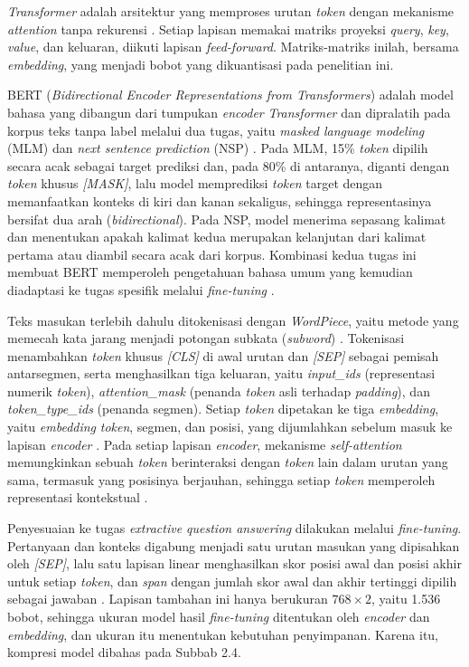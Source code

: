 \textit{Transformer} adalah arsitektur yang memproses urutan \textit{token} dengan mekanisme \textit{attention} tanpa rekurensi \parencite{vaswani2017attention}. Setiap lapisan memakai matriks proyeksi \textit{query}, \textit{key}, \textit{value}, dan keluaran, diikuti lapisan \textit{feed-forward}. Matriks-matriks inilah, bersama \textit{embedding}, yang menjadi bobot yang dikuantisasi pada penelitian ini.

BERT (\textit{Bidirectional Encoder Representations from Transformers}) adalah model bahasa yang dibangun dari tumpukan \textit{encoder} \textit{Transformer} dan dipralatih pada korpus teks tanpa label melalui dua tugas, yaitu \textit{masked language modeling} (MLM) dan \textit{next sentence prediction} (NSP) \parencite{devlin2019bert}. Pada MLM, 15\% \textit{token} dipilih secara acak sebagai target prediksi dan, pada 80\% di antaranya, diganti dengan \textit{token} khusus \textit{[MASK]}, lalu model memprediksi \textit{token} target dengan memanfaatkan konteks di kiri dan kanan sekaligus, sehingga representasinya bersifat dua arah (\textit{bidirectional}). Pada NSP, model menerima sepasang kalimat dan menentukan apakah kalimat kedua merupakan kelanjutan dari kalimat pertama atau diambil secara acak dari korpus. Kombinasi kedua tugas ini membuat BERT memperoleh pengetahuan bahasa umum yang kemudian diadaptasi ke tugas spesifik melalui \textit{fine-tuning} \parencite{devlin2019bert}.

Teks masukan terlebih dahulu ditokenisasi dengan \textit{WordPiece}, yaitu metode yang memecah kata jarang menjadi potongan subkata (\textit{subword}) \parencite{devlin2019bert}. Tokenisasi menambahkan \textit{token} khusus \textit{[CLS]} di awal urutan dan \textit{[SEP]} sebagai pemisah antarsegmen, serta menghasilkan tiga keluaran, yaitu \textit{input\_ids} (representasi numerik \textit{token}), \textit{attention\_mask} (penanda \textit{token} asli terhadap \textit{padding}), dan \textit{token\_type\_ids} (penanda segmen). Setiap \textit{token} dipetakan ke tiga \textit{embedding}, yaitu \textit{embedding} \textit{token}, segmen, dan posisi, yang dijumlahkan sebelum masuk ke lapisan \textit{encoder} \parencite{devlin2019bert}. Pada setiap lapisan \textit{encoder}, mekanisme \textit{self-attention} memungkinkan sebuah \textit{token} berinteraksi dengan \textit{token} lain dalam urutan yang sama, termasuk yang posisinya berjauhan, sehingga setiap \textit{token} memperoleh representasi kontekstual \parencite{vaswani2017attention}.

Penyesuaian ke tugas \textit{extractive question answering} dilakukan melalui \textit{fine-tuning}. Pertanyaan dan konteks digabung menjadi satu urutan masukan yang dipisahkan oleh \textit{[SEP]}, lalu satu lapisan linear menghasilkan skor posisi awal dan posisi akhir untuk setiap \textit{token}, dan \textit{span} dengan jumlah skor awal dan akhir tertinggi dipilih sebagai jawaban \parencite{devlin2019bert}. Lapisan tambahan ini hanya berukuran $768 \times 2$, yaitu 1.536 bobot, sehingga ukuran model hasil \textit{fine-tuning} ditentukan oleh \textit{encoder} dan \textit{embedding}, dan ukuran itu menentukan kebutuhan penyimpanan. Karena itu, kompresi model dibahas pada Subbab 2.4.

